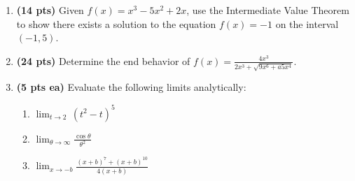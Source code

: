 \documentclass[12pt]{article}
\begin{document}
\begin{enumerate}

\newpage
\item {\bf (14 pts)} Given %
$f(x)=x^3-5x^2+2x$, use the Intermediate Value Theorem to show there exists
a solution to the equation %
$f(x)=-1$ on the interval $(-1,5)$.
\vspace{22pc}

\item {\bf (24 pts)} Determine the end behavior of %
	$f(x)=\frac{4x^3}{2x^3+\sqrt{9x^6+a5x^4}}$.
	\vspace{22pc}

\newpage
\item {\bf (5 pts ea)} Evaluate the following limits analytically:
\begin{enumerate}
	\item $\lim_{t\to 2}\,(t^2-t)^5$
	\vspace{14pc}
	\item $\lim_{\theta\to\infty}\frac{\cos{\theta}}{\theta^2}$
	\vspace{14pc}
		
	\item $\lim_{x\to -b}\frac{(x+b)^7+(x+b)^{10}}{4(x+b)}$
	\vspace{14pc}
\end{enumerate}

\newpage

\end{enumerate}
\end{document}
